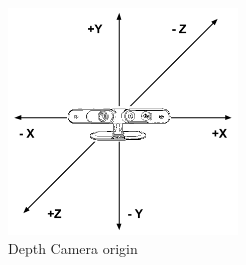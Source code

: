 \begin{figure}
	[h] \centering 
	\includegraphics[height=6cm]{figures/content/xtion-origin.png} \caption{Depth Camera origin} \label{fg:xtion:origin} 
\end{figure}
